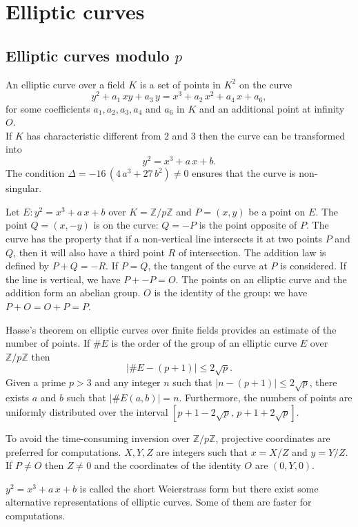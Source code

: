 \documentclass[a4paper, 11pt, pdftex]{report}
\theoremstyle{plain}
\theoremstyle{definition}
\begin{document}
\chapter{Elliptic curves}

\section{Elliptic curves modulo $p$}

An elliptic curve over a field $K$ is a set of points in $K^2$ on the curve
$$y^2 + a_1\, x y + a_3\, y = x^3 + a_2\, x^2 + a_4\, x + a_6,$$
for some coefficients $a_1, a_2, a_3, a_4$ and $a_6$ in $K$ and an additional point at infinity $O$.\\
If $K$ has characteristic different from 2 and 3 then the curve can be transformed into
$$y^2 = x^3 + a\,x + b.$$
The condition $\Delta = -16\,(4\,a^3 + 27\,b^2) \neq 0$ ensures that the curve is non-singular.

Let $E: y^2 = x^3 + a\,x + b$ over $K = \mathbb{Z}/p\mathbb{Z}$ and $P = (x, y)$ be
a point on $E$. The point $Q = (x, -y)$ is on the curve: $Q = -P$ is the point opposite of $P$.
The curve has the property that if a non-vertical line intersects it at two points $P$ and $Q$,
then it will also have a third point $R$ of intersection. The addition law is defined
by $P + Q = -R$. If $P = Q$, the tangent of the curve at $P$ is considered.
If the line is vertical, we have $P + -P = O$.
The points on an elliptic curve and the addition form an abelian group.
$O$ is the identity of the group: we have $P + O = O + P = P$.

Hasse's theorem on elliptic curves over finite fields provides an estimate of the number of
points. If $\#E$ is the order of the group of an elliptic curve $E$ over $\mathbb{Z}/p\mathbb{Z}$
then
$$|\#E - (p + 1) | \le 2\sqrt{p}.$$
Given a prime $p > 3$ and any integer $n$ such that $|n - (p + 1)| \le 2\sqrt{p}$, there exists
$a$ and $b$ such that $|\#E(a, b)| = n$. Furthermore, the numbers of points are uniformly
distributed over the interval $[p + 1 - 2\sqrt{p},\, p + 1 + 2\sqrt{p}]$.

To avoid the time-consuming inversion over $\mathbb{Z}/p\mathbb{Z}$, projective coordinates
are preferred for computations. $X, Y, Z$ are integers such that $x = X/Z$ and $y = Y/Z$.
If $P \neq O$ then $Z \neq 0$ and the coordinates of the identity $O$ are $(0, Y, 0)$.

$y^2 = x^3 + a\,x + b$ is called the short Weierstrass form but there exist
some alternative representations of elliptic curves. Some of them are faster for computations.
\end{document}
